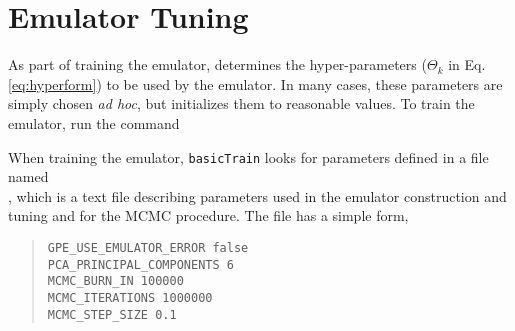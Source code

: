\section{Emulator Tuning}

As part of training the emulator,  determines the hyper-parameters ($\Theta_k$ in Eq. \eqref{eq:hyperform}) to be used by the emulator. In many cases, these parameters are simply chosen \emph{ad hoc}, but  initializes them to reasonable values. To train the emulator, run the command


When training the emulator, {\tt basicTrain} looks for parameters defined in a file named\\ , which is a text file describing parameters used in the emulator construction and tuning and for the MCMC procedure. The file has a simple form, 

\begin{quote}
{\tt GPE\_USE\_EMULATOR\_ERROR false}\\
{\tt PCA\_PRINCIPAL\_COMPONENTS 6}\\
{\tt MCMC\_BURN\_IN 100000}\\
{\tt MCMC\_ITERATIONS 1000000}\\
{\tt MCMC\_STEP\_SIZE 0.1}
\end{quote}

